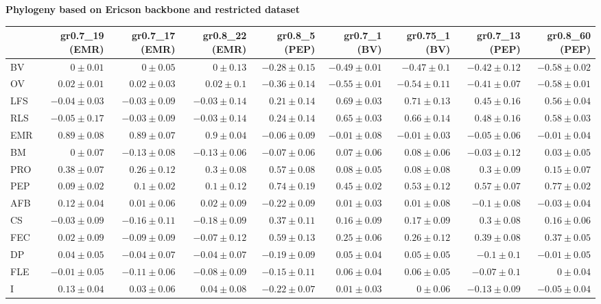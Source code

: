 \begin{landscape}
\begin{table}
\begin{footnotesize}
\textbf{Phylogeny based on Ericson backbone and restricted dataset}

\begin{tabular}{@{}l|rrrrrrrr@{}}
\toprule
  & gr0.7\_19 (EMR) & gr0.7\_17 (EMR) & gr0.8\_22 (EMR) & gr0.8\_5 (PEP) & gr0.7\_1 (BV) & gr0.75\_1 (BV) & gr0.7\_13 (PEP) & gr0.8\_60 (PEP)\\
\midrule
BV & $0 \pm 0.01$ & $0 \pm 0.05$ & $0 \pm 0.13$ & $-0.28 \pm 0.15$ & $-0.49 \pm 0.01$ & $-0.47 \pm 0.1$ & $-0.42 \pm 0.12$ & $-0.58 \pm 0.02$\\
OV & $0.02 \pm 0.01$ & $0.02 \pm 0.03$ & $0.02 \pm 0.1$ & $-0.36 \pm 0.14$ & $-0.55 \pm 0.01$ & $-0.54 \pm 0.11$ & $-0.41 \pm 0.07$ & $-0.58 \pm 0.01$\\
LFS & $-0.04 \pm 0.03$ & $-0.03 \pm 0.09$ & $-0.03 \pm 0.14$ & $0.21 \pm 0.14$ & $0.69 \pm 0.03$ & $0.71 \pm 0.13$ & $0.45 \pm 0.16$ & $0.56 \pm 0.04$\\
RLS & $-0.05 \pm 0.17$ & $-0.03 \pm 0.09$ & $-0.03 \pm 0.14$ & $0.24 \pm 0.14$ & $0.65 \pm 0.03$ & $0.66 \pm 0.14$ & $0.48 \pm 0.16$ & $0.58 \pm 0.03$\\
EMR & $0.89 \pm 0.08$ & $0.89 \pm 0.07$ & $0.9 \pm 0.04$ & $-0.06 \pm 0.09$ & $-0.01 \pm 0.08$ & $-0.01 \pm 0.03$ & $-0.05 \pm 0.06$ & $-0.01 \pm 0.04$\\
BM & $0 \pm 0.07$ & $-0.13 \pm 0.08$ & $-0.13 \pm 0.06$ & $-0.07 \pm 0.06$ & $0.07 \pm 0.06$ & $0.08 \pm 0.06$ & $-0.03 \pm 0.12$ & $0.03 \pm 0.05$\\
PRO & $0.38 \pm 0.07$ & $0.26 \pm 0.12$ & $0.3 \pm 0.08$ & $0.57 \pm 0.08$ & $0.08 \pm 0.05$ & $0.08 \pm 0.08$ & $0.3 \pm 0.09$ & $0.15 \pm 0.07$\\
PEP & $0.09 \pm 0.02$ & $0.1 \pm 0.02$ & $0.1 \pm 0.12$ & $0.74 \pm 0.19$ & $0.45 \pm 0.02$ & $0.53 \pm 0.12$ & $0.57 \pm 0.07$ & $0.77 \pm 0.02$\\
AFB & $0.12 \pm 0.04$ & $0.01 \pm 0.06$ & $0.02 \pm 0.09$ & $-0.22 \pm 0.09$ & $0.01 \pm 0.03$ & $0.01 \pm 0.08$ & $-0.1 \pm 0.08$ & $-0.03 \pm 0.04$\\
CS & $-0.03 \pm 0.09$ & $-0.16 \pm 0.11$ & $-0.18 \pm 0.09$ & $0.37 \pm 0.11$ & $0.16 \pm 0.09$ & $0.17 \pm 0.09$ & $0.3 \pm 0.08$ & $0.16 \pm 0.06$\\
FEC & $0.02 \pm 0.09$ & $-0.09 \pm 0.09$ & $-0.07 \pm 0.12$ & $0.59 \pm 0.13$ & $0.25 \pm 0.06$ & $0.26 \pm 0.12$ & $0.39 \pm 0.08$ & $0.37 \pm 0.05$\\
DP & $0.04 \pm 0.05$ & $-0.04 \pm 0.07$ & $-0.04 \pm 0.07$ & $-0.19 \pm 0.09$ & $0.05 \pm 0.04$ & $0.05 \pm 0.05$ & $-0.1 \pm 0.1$ & $-0.01 \pm 0.05$\\
FLE & $-0.01 \pm 0.05$ & $-0.11 \pm 0.06$ & $-0.08 \pm 0.09$ & $-0.15 \pm 0.11$ & $0.06 \pm 0.04$ & $0.06 \pm 0.05$ & $-0.07 \pm 0.1$ & $0 \pm 0.04$\\
I & $0.13 \pm 0.04$ & $0.03 \pm 0.06$ & $0.04 \pm 0.08$ & $-0.22 \pm 0.07$ & $0.01 \pm 0.03$ & $0 \pm 0.06$ & $-0.13 \pm 0.09$ & $-0.05 \pm 0.04$\\
\bottomrule
\end{tabular}
\end{footnotesize}
\end{table}


\end{landscape}

